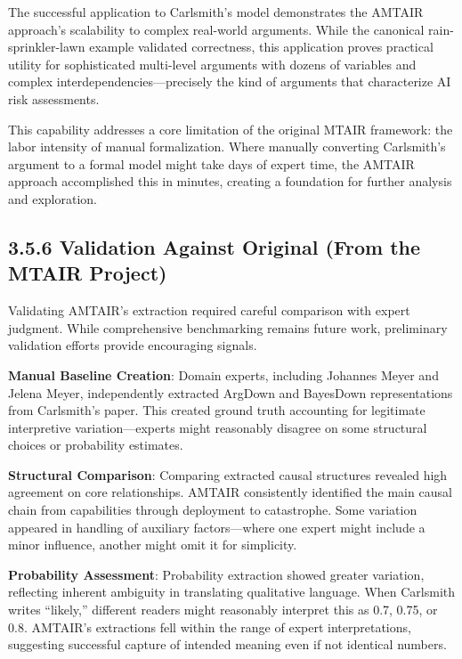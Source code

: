 \documentclass[
  11pt,
  letterpaper,
  openany]{book}
\begin{document}
\begin{landscape}
The successful application to Carlsmith's model demonstrates the AMTAIR
approach's scalability to complex real-world arguments. While the
canonical rain-sprinkler-lawn example validated correctness, this
application proves practical utility for sophisticated multi-level
arguments with dozens of variables and complex
interdependencies---precisely the kind of arguments that characterize AI
risk assessments.

This capability addresses a core limitation of the original MTAIR
framework: the labor intensity of manual formalization. Where manually
converting Carlsmith's argument to a formal model might take days of
expert time, the AMTAIR approach accomplished this in minutes, creating
a foundation for further analysis and exploration.

\end{landscape}

\subsection{3.5.6 Validation Against Original (From the MTAIR
Project)}\label{sec-carlsmith-validation}

Validating AMTAIR's extraction required careful comparison with expert
judgment. While comprehensive benchmarking remains future work,
preliminary validation efforts provide encouraging signals.

\textbf{Manual Baseline Creation}: Domain experts, including Johannes
Meyer and Jelena Meyer, independently extracted ArgDown and BayesDown
representations from Carlsmith's paper. This created ground truth
accounting for legitimate interpretive variation---experts might
reasonably disagree on some structural choices or probability estimates.

\textbf{Structural Comparison}: Comparing extracted causal structures
revealed high agreement on core relationships. AMTAIR consistently
identified the main causal chain from capabilities through deployment to
catastrophe. Some variation appeared in handling of auxiliary
factors---where one expert might include a minor influence, another
might omit it for simplicity.

\textbf{Probability Assessment}: Probability extraction showed greater
variation, reflecting inherent ambiguity in translating qualitative
language. When Carlsmith writes ``likely,'' different readers might
reasonably interpret this as 0.7, 0.75, or 0.8. AMTAIR's extractions
fell within the range of expert interpretations, suggesting successful
capture of intended meaning even if not identical numbers.
\end{document}
